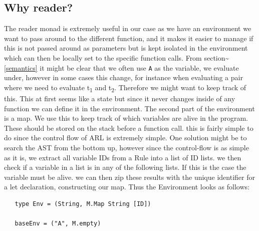\documentclass[a4paper]{article}
\begin{document}
\subsection{Why reader?}
\label{sec:orgf493c49}
The reader monad is extremely useful in our case as we have an environment we want to pass around to the different function, and it makes it easier to manage if this is not passed around as parameters but is kept isolated in the environment which can then be locally set to the specific function calls. From section\textasciitilde{}\ref{semantics} it might be clear that we often use \texttt{A} as the variable, we evaluate under, however in some cases this change, for instance when evaluating a pair where we need to evaluate t\textsubscript{1} and t\textsubscript{2}. Therefore we might want to keep track of this. This at first seems like a state but since it never changes inside of any function we can define it in the environment. The second part of the environment is a map. We use this to keep track of which variables are alive in the program. These should be stored on the stack before a function call. this is fairly simple to do since the control flow of ARL is extremely simple. One solution might be to search the AST from the bottom up, however since the control-flow is as simple as it is, we extract all variable IDs from a Rule into a list of ID lists. we then check if a variable in a list is in any of the following lists. If this is the case the variable must be alive. we can then zip these results with the unique identifier for a let declaration, constructing our map. Thus the Environment looks as follows:
\begin{verbatim}
   type Env = (String, M.Map String [ID])

   baseEnv = ("A", M.empty)
\end{verbatim}
\end{document}
